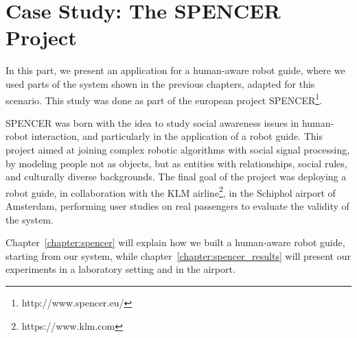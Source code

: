 \part{Case Study: The SPENCER Project} %

\label{part:case_study} %


In this part, we present an application for a human-aware robot guide, where we used parts of the system shown in the previous chapters, adapted for this scenario. This study was done as part of the european project SPENCER\footnote{http://www.spencer.eu/}.

 SPENCER  was born with the idea to study social awareness issues in human-robot interaction, and particularly in the application of a robot guide. This project aimed at joining complex robotic algorithms  with social signal processing, by modeling people not as objects, but as entities with relationships, social rules, and culturally diverse backgrounds. The final goal of the project was deploying a robot guide, in collaboration with the KLM airline\footnote{https://www.klm.com}, in the Schiphol airport of Amsterdam, performing user studies on real passengers to evaluate the validity of the system.

Chapter~\ref{chapter:spencer} will explain how we built a human-aware robot guide, starting from our system, while chapter~\ref{chapter:spencer_results} will present our experiments in a laboratory setting and in the airport.


 
 
